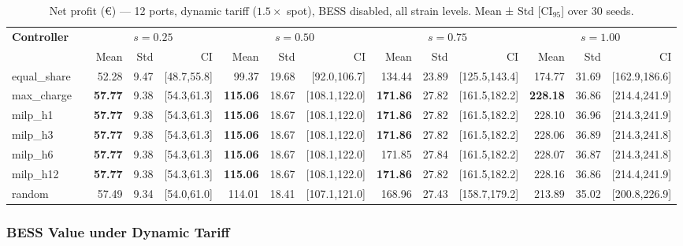 \begin{table}[!htb]
\centering
\caption{Net profit (€) — 12 ports, dynamic tariff ($1.5\times$ spot),
         BESS disabled, all strain levels.
         Mean ± Std [CI$_{95}$] over 30 seeds.}
\label{tab:gc_dyn_nobess_12p}
\setlength{\tabcolsep}{3pt}
\begin{tabular}{lp{0.6cm} rrr rrr rrr rrr}
\toprule
\textbf{Controller} & &
  \multicolumn{3}{c}{$s=0.25$} &
  \multicolumn{3}{c}{$s=0.50$} &
  \multicolumn{3}{c}{$s=0.75$} &
  \multicolumn{3}{c}{$s=1.00$} \\
\cmidrule(lr){3-5}\cmidrule(lr){6-8}\cmidrule(lr){9-11}\cmidrule(lr){12-14}
 & & Mean & Std & CI & Mean & Std & CI & Mean & Std & CI & Mean & Std & CI \\
\midrule
equal\_share & &  52.28 &  9.47 & [48.7,55.8] &  99.37 & 19.68 & [92.0,106.7] & 134.44 & 23.89 & [125.5,143.4] & 174.77 & 31.69 & [162.9,186.6] \\
max\_charge  & &  \textbf{57.77} &  9.38 & [54.3,61.3] & \textbf{115.06} & 18.67 & [108.1,122.0] & \textbf{171.86} & 27.82 & [161.5,182.2] & \textbf{228.18} & 36.86 & [214.4,241.9] \\
milp\_h1     & &  \textbf{57.77} &  9.38 & [54.3,61.3] & \textbf{115.06} & 18.67 & [108.1,122.0] & \textbf{171.86} & 27.82 & [161.5,182.2] & 228.10 & 36.96 & [214.3,241.9] \\
milp\_h3     & &  \textbf{57.77} &  9.38 & [54.3,61.3] & \textbf{115.06} & 18.67 & [108.1,122.0] & \textbf{171.86} & 27.82 & [161.5,182.2] & 228.06 & 36.89 & [214.3,241.8] \\
milp\_h6     & &  \textbf{57.77} &  9.38 & [54.3,61.3] & \textbf{115.06} & 18.67 & [108.1,122.0] & 171.85 & 27.84 & [161.5,182.2] & 228.07 & 36.87 & [214.3,241.8] \\
milp\_h12    & &  \textbf{57.77} &  9.38 & [54.3,61.3] & \textbf{115.06} & 18.67 & [108.1,122.0] & \textbf{171.86} & 27.82 & [161.5,182.2] & 228.16 & 36.86 & [214.4,241.9] \\
random       & &  57.49 &  9.34 & [54.0,61.0] & 114.01 & 18.41 & [107.1,121.0] & 168.96 & 27.43 & [158.7,179.2] & 213.89 & 35.02 & [200.8,226.9] \\
\bottomrule
\end{tabular}
\end{table}

\subsubsection{BESS Value under Dynamic Tariff}
\label{subsubsec:gc_dyn_bess_gain}

